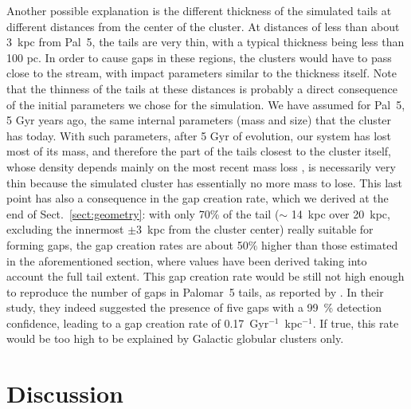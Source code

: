 \documentclass{aa}
\begin{document}
    Another possible explanation is the different thickness of the simulated tails at different distances from the center of the cluster. At distances of less than about 3~kpc from Pal~5, the tails are very thin, with a typical thickness being less than 100 pc. In order to cause gaps in these regions, the clusters would have to pass close to the stream, with impact parameters similar to the thickness itself. Note that the thinness of the tails at these distances is probably a direct consequence of the initial parameters we chose for the simulation. We have assumed for Pal~5, 5 Gyr years ago, the same internal parameters (mass and size) that the cluster has today. With such parameters, after 5 Gyr of evolution, our system has lost most of its mass, and therefore the part of the tails closest to the cluster itself, whose density depends mainly on the most recent mass loss \citep[see, for example, Fig.~A.3 in][]{2012A&A...546L...7M}, is necessarily very thin because the simulated cluster has essentially no more mass to lose. This last point has also a consequence in the gap creation rate, which we derived at the end of Sect.~\ref{sect:geometry}: with only 70\% of the tail  ($\sim$ 14~kpc over 20~kpc, excluding the innermost $\pm 3$~kpc from the cluster center) really suitable for forming gaps, the gap creation rates are about 50$\%$ higher than those estimated in the aforementioned section, where values have been derived taking into account the full tail extent. This gap creation rate would be still not high enough to reproduce the  number of gaps in Palomar~5 tails, as reported by \citet{2012ApJ...760...75C}. In their study, they indeed suggested the presence of  five gaps with a 99~\% detection confidence, leading to a gap creation rate of 0.17~Gyr$^{-1}$~kpc$^{-1}$. If true, this rate would be too high to be explained by Galactic globular clusters only. 



  
  
\section{Discussion}
  
\end{document}
